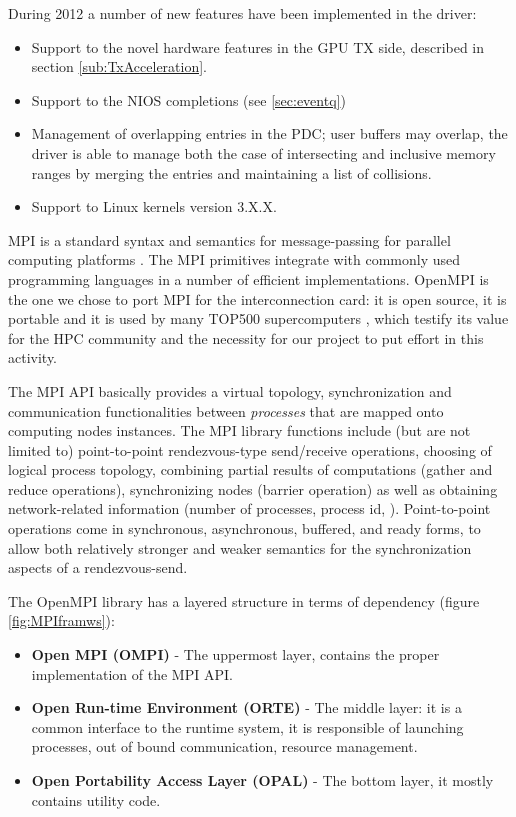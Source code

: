 During 2012 a number of new features have been implemented in the
\apenetp driver:
\begin{itemize}
\item Support to the novel hardware features in the GPU TX side,
  described in section \ref{sub:TxAcceleration}.
\item Support to the NIOS completions (see \ref{sec:eventq})
\item Management of overlapping entries in the PDC; user buffers may
  overlap, the driver is able to manage both the case of intersecting
  and inclusive memory ranges by merging the entries and maintaining a
  list of collisions.
\item Support to Linux kernels version 3.X.X. \end{itemize}

\label{sec:MPI}
MPI is a standard syntax and semantics for message-passing for
parallel computing platforms \cite{MPIstd}. The MPI primitives
integrate with commonly used programming languages in a number of
efficient implementations. OpenMPI \cite{OpenMPI} is the one we chose
to port MPI for the \apenetp interconnection card: it is open source,
it is portable and it is used by many TOP500 supercomputers
\cite{top500}, which testify its value for the HPC community and the
necessity for our project to put effort in this activity.

The MPI API basically provides a virtual topology, synchronization and
communication functionalities between \emph{processes} that are mapped
onto computing nodes instances.  The MPI library functions include
(but are not limited to) point-to-point rendezvous-type send/receive
operations, choosing of logical process topology, combining partial
results of computations (gather and reduce operations), synchronizing
nodes (barrier operation) as well as obtaining network-related
information (number of processes, process id, \etc). Point-to-point
operations come in synchronous, asynchronous, buffered, and ready
forms, to allow both relatively stronger and weaker semantics for the
synchronization aspects of a rendezvous-send.

The OpenMPI library has a layered structure in terms of
dependency (figure \ref{fig:MPIframws}):
\begin{itemize}
\item \textbf{Open MPI (OMPI)} - The uppermost layer, contains the
  proper implementation of the MPI API.
\item \textbf{Open Run-time Environment (ORTE)} - The middle layer: it
  is a common interface to the runtime system, it is responsible of
  launching processes, out of bound communication, resource
  management.
\item \textbf{Open Portability Access Layer (OPAL)} - The bottom
  layer, it mostly contains utility code.
\end{itemize}


